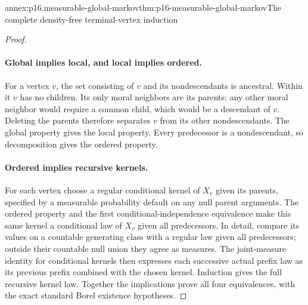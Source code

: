 \begin{annexitem}{annex:p16.measurable-global-markov}{thm:p16-measurable-global-markov}{The complete density-free terminal-vertex induction}
\begin{proof}
\paragraph{Global implies local, and local implies ordered.}
For a vertex \(v\), the set consisting of \(v\) and its
nondescendants is ancestral. Within it \(v\) has no children.
Its only moral neighbors are its parents: any other moral neighbor
would require a common child, which would be a descendant of \(v\).
Deleting the parents therefore separates \(v\) from its other
nondescendants. The global property gives the local property.
Every predecessor is a nondescendant, so decomposition gives the
ordered property.

\paragraph{Ordered implies recursive kernels.}
For each vertex choose a regular conditional kernel of \(X_v\)
given its parents, specified by a measurable probability default on
any null parent arguments. The ordered property and the first
conditional-independence equivalence make this same kernel a
conditional law of \(X_v\) given all predecessors. In detail,
compare its values on a countable generating class with a regular
law given all predecessors; outside their countable null union they
agree as measures. The joint-measure identity for conditional kernels
then expresses each successive actual prefix law as its previous
prefix combined with the chosen kernel. Induction gives the full
recursive kernel law. Together the implications prove all four
equivalences, with the exact standard Borel existence hypotheses.
\end{proof}
\end{annexitem}

